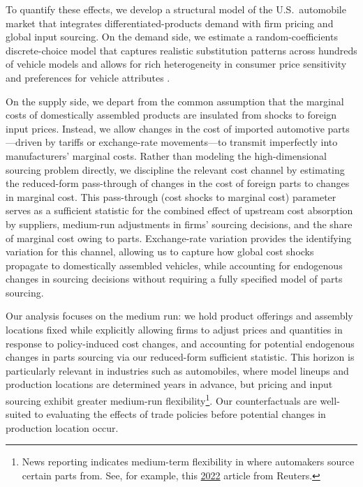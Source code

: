 \documentclass[11pt]{article}
\begin{document}
To quantify these effects, we develop a structural model of the U.S.\ automobile market that integrates differentiated-products demand with firm pricing and global input sourcing. On the demand side, we estimate a random-coefficients discrete-choice model that captures realistic substitution patterns across hundreds of vehicle models and allows for rich heterogeneity in consumer price sensitivity and preferences for vehicle attributes \citep{nevo_measuring_2001,berry_automobile_1995,grieco_evolution_2024}.

On the supply side, we depart from the common assumption that the marginal costs of domestically assembled products are insulated from shocks to foreign input prices. Instead, we allow changes in the cost of imported automotive parts---driven by tariffs or exchange-rate movements---to transmit imperfectly into manufacturers’ marginal costs. Rather than modeling the high-dimensional sourcing problem directly, we discipline the relevant cost channel by estimating the reduced-form pass-through of changes in the cost of foreign parts to changes in marginal cost. This pass-through (cost shocks to marginal cost) parameter serves as a sufficient statistic for the combined effect of upstream cost absorption by suppliers, medium-run adjustments in firms’ sourcing decisions, and the share of marginal cost owing to parts. Exchange-rate variation provides the identifying variation for this channel, allowing us to capture how global cost shocks propagate to domestically assembled vehicles, while accounting for endogenous changes in sourcing decisions without requiring a fully specified model of parts sourcing.

Our analysis focuses on the medium run: we hold product offerings and assembly locations fixed while explicitly allowing firms to adjust prices and quantities in response to policy-induced cost changes, and accounting for potential endogenous changes in parts sourcing via our reduced-form sufficient statistic. This horizon is particularly relevant in industries such as automobiles, where model lineups and production locations are determined years in advance, but pricing and input sourcing exhibit greater medium-run flexibility\footnote{News reporting indicates medium-term flexibility in where automakers source certain parts from. See, for example, this \href{https://www.reuters.com/business/autos-transportation/how-cheap-component-could-help-kill-off-combustion-cars-2022-05-30/}{2022} article from Reuters.}.
Our counterfactuals are well-suited to evaluating the effects of trade policies before potential changes in production location occur.
\end{document}
